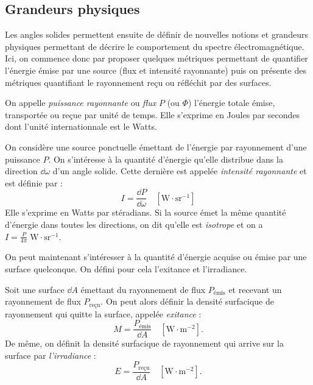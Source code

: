 \begin{proposition}
\end{proposition}

\subsection{Grandeurs physiques}

Les angles solides permettent ensuite de définir de nouvelles notions et grandeurs physiques permettant de décrire le comportement du spectre électromagnétique. Ici, on commence donc par proposer quelques métriques permettant de quantifier l'énergie émise par une source (flux et intensité rayonnante) puis on présente des métriques quantifiant le rayonnement reçu ou réfléchit par des surfaces. 

\begin{definition}
    On appelle \emph{puissance rayonnante} ou \emph{flux} $P$ (ou $ \Phi$) l'énergie totale émise, transportée ou reçue par unité de temps. Elle s'exprime en Joules par secondes dont l'unité internationnale est le Watts. 
\end{definition}

\begin{definition}
    On considère une source ponctuelle émettant de l'énergie par rayonnement d'une puissance $P$. On s'intéresse à la quantité d'énergie qu'elle distribue dans la direction $ \dd \omega$ d'un angle solide. Cette dernière est appelée \emph{intensité rayonnante} et est définie par : 
    \begin{equation}
        I = \frac{\dd P}{\dd \omega} \quad [\mathrm{W} \cdot \mathrm{sr}^{-1}]
    \end{equation}
    Elle s'exprime en Watts par stéradians. Si la source émet la même quantité d'énergie dans toutes les directions, on dit qu'elle est \emph{isotrope} et on a $I = \frac{P}{4 \pi}\; \mathrm{W} \cdot \mathrm{sr}^{-1}$. 
\end{definition}

On peut maintenant s'intéresser à la quantité d'énergie acquise ou émise par une surface quelconque. On défini pour cela l'exitance et l'irradiance. 

\begin{definition}
    Soit une surface $ \dd A$ émettant du rayonnement de flux $ P_{\text{émis}}$ et recevant un rayonnement de flux $ P_{\text{reçu}}$. On peut alors définir la densité surfacique de rayonnement qui quitte la surface, appelée \emph{exitance} : 
    \begin{equation}
        M = \frac{P_{\text{émis}}}{\dd A} \quad [\mathrm{W} \cdot \mathrm{m}^{-2}]. 
    \end{equation}
    De même, on définit la densité surfacique de rayonnement qui arrive sur la surface par \emph{l'irradiance} : 
    \begin{equation}
        E = \frac{P_{\text{reçu}}}{\dd A} \quad [\mathrm{W} \cdot \mathrm{m}^{-2}]. 
    \end{equation}
\end{definition}

